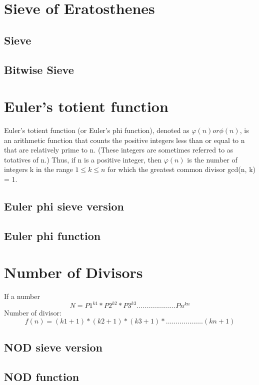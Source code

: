 \documentclass[11pt]{report}
\begin{document}
\section{Sieve of Eratosthenes}
\subsection{Sieve}

\subsection{Bitwise Sieve}

\section{Euler's totient function}
Euler's totient function (or Euler's phi function), denoted as $\varphi (n) or  \phi(n)$, is an arithmetic function that counts the positive integers less than or equal to n that are relatively prime to n. (These integers are sometimes referred to as totatives of n.) Thus, if n is a positive integer, then $\varphi (n)$ is the number of integers k in the range $1 \leq k \leq n$ for which the greatest common divisor gcd(n, k) = 1.
\subsection{Euler phi sieve version}

\subsection{Euler phi function}

\newpage
\section{Number of Divisors}
If a number $$N= P1^{k1}*P2^{k2}*P3^{k3}………...........Pn^{kn}$$
Number of divisor: $$f(n)=(k1+1)*(k2+1)*(k3+1)*…….........….(kn+1)$$
\subsection{NOD sieve version}

\subsection{NOD function}

\end{document}
